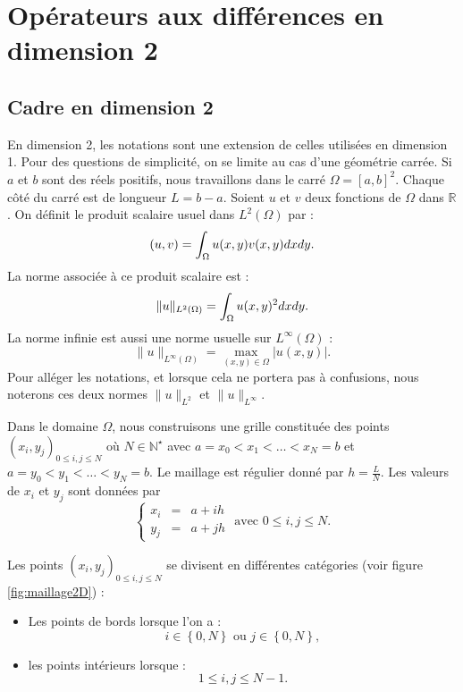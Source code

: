 \section{Opérateurs aux différences en dimension 2}


\subsection{Cadre en dimension 2}
\label{sec:notation_2D}

En dimension 2, les notations sont une extension de celles utilisées en dimension 1. Pour des questions de simplicité, on se limite au cas d'une géométrie carrée. Si $a$ et $b$ sont des réels positifs, nous travaillons dans le carré $\Omega = [a,b]^2$. Chaque côté du carré est de longueur $L=b-a$. 
Soient $u$ et $v$ deux fonctions de $\Omega$ dans $\mathbb{R}$. On définit le produit scalaire usuel dans $L^2 ( \Omega ) $ par :
\begin{equation}
(u,v) = \displaystyle\int_{\Omega} u(x,y) v(x,y) dx dy.
\end{equation}
La norme associée à ce produit scalaire est :
\begin{equation}
\| u \|_{L^2(\Omega)} = \displaystyle\int_{\Omega} u(x,y)^2 dx dy. 
\end{equation}
La norme infinie est aussi une norme usuelle sur $L^{\infty}(\Omega)$ :
\begin{equation}
\| u \|_{L^{\infty} ( \Omega )} = \max_{(x,y) \in \Omega} |u(x,y)|.
\end{equation}
Pour alléger les notations, et lorsque cela ne portera pas à confusions, nous noterons ces deux normes $\| u \|_{L^2}$ et $\| u \|_{L^{\infty}}$.

Dans le domaine $\Omega$, nous construisons une grille constituée des points $(x_i,y_j)_{0 \leq i,j \leq N}$ où $N \in \mathbb{N}^{\star}$ avec $a = x_0 < x_1 < \ldots < x_N = b$ et $a = y_0 < y_1 < \ldots < y_N = b$. Le maillage est régulier donné par $h = \frac{L}{N}$. Les valeurs de $x_i$ et $y_j$ sont données par
\begin{equation}
\left\lbrace\begin{array}{rcl}
x_i & = & a + i h \\
y_j & = & a + j h 
\end{array}\right. \text{ avec } 0 \leq i,j \leq N.
\end{equation}

Les points $(x_i,y_j)_{0 \leq i,j \leq N}$ se divisent en différentes catégories (voir figure \ref{fig:maillage2D}) :
\begin{itemize}
\item Les points de bords lorsque l'on a :
\begin{equation}
i \in \left\lbrace 0 , N \right\rbrace \text{ ou } j \in \left\lbrace 0 , N \right\rbrace,
\end{equation}
\item les points intérieurs lorsque :
\begin{equation}
1 \leq i,j \leq N-1.
\end{equation}
\end{itemize}



